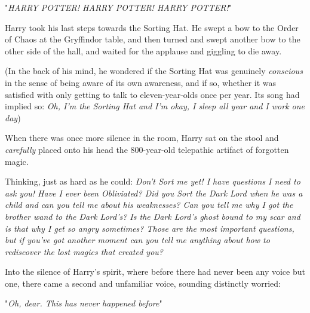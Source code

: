 "\emph{HARRY POTTER! HARRY POTTER! HARRY POTTER!}"

Harry took his last steps towards the Sorting Hat. He swept a bow to the Order
of Chaos at the Gryffindor table, and then turned and swept another bow to the
other side of the hall, and waited for the applause and giggling to die away.

(In the back of his mind, he wondered if the Sorting Hat was genuinely
\emph{conscious} in the sense of being aware of its own awareness, and if so,
whether it was satisfied with only getting to talk to eleven-year-olds once per
year. Its song had implied so: \emph{Oh, I'm the Sorting Hat and I'm okay, I
sleep all year and I work one day{\el}})

When there was once more silence in the room, Harry sat on the stool and
\emph{carefully} placed onto his head the 800-year-old telepathic artifact of
forgotten magic.

Thinking, just as hard as he could: \emph{Don't Sort me yet! I have questions I
need to ask you! Have I ever been Obliviated? Did you Sort the Dark Lord when
he was a child and can you tell me about his weaknesses? Can you tell me why I
got the brother wand to the Dark Lord's? Is the Dark Lord's ghost bound to my
scar and is that why I get so angry sometimes? Those are the most important
questions, but if you've got another moment can you tell me anything about how
to rediscover the lost magics that created you?}

Into the silence of Harry's spirit, where before there had never been any voice
but one, there came a second and unfamiliar voice, sounding distinctly worried:

"\emph{Oh, dear. This has never happened before{\el}}"
